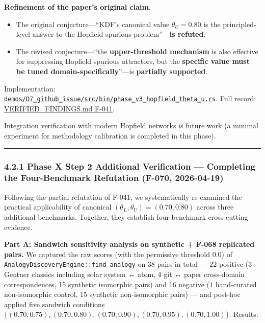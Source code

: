 \textbf{Refinement of the paper's original claim.}

\begin{itemize}
\tightlist
\item
  The original conjecture---``KDF's canonical value \(\theta_U = 0.80\) is the principled-level answer to the Hopfield spurious problem''---\textbf{is refuted}.
\item
  The revised conjecture---``the \textbf{upper-threshold mechanism} is also effective for suppressing Hopfield spurious attractors, but the \textbf{specific value must be tuned domain-specifically}''---is \textbf{partially supported}.
\end{itemize}

Implementation: \href{../../demos/D7_github_issue/src/bin/phase_v3_hopfield_theta_u.rs}{\texttt{demos/D7\_github\_issue/src/bin/phase\_v3\_hopfield\_theta\_u.rs}}. Full record: \href{../VERIFIED_FINDINGS.md}{VERIFIED\_FINDINGS.md F-041}.

Integration verification with modern Hopfield networks \citep{ramsauer2021hopfield} is future work (a minimal experiment for methodology calibration is completed in this phase).

\begin{center}\rule{0.5\linewidth}{0.5pt}\end{center}

\subsubsection{4.2.1 Phase X Step 2 Additional Verification --- Completing the Four-Benchmark Refutation (F-070, 2026-04-19)}\label{phase-x-step-2-additional-verification-completing-the-four-benchmark-refutation-f-070-2026-04-19}

Following the partial refutation of F-041, we systematically re-examined the practical applicability of canonical \((\theta_L, \theta_U) = (0.70, 0.80)\) across three additional benchmarks. Together, they establish four-benchmark cross-cutting evidence.

\textbf{Part A: Sandwich sensitivity analysis on synthetic + F-068 replicated pairs.} We captured the raw scores (with the permissive threshold 0.0) of \texttt{AnalogyDiscoveryEngine::find\_analogy} on 38 pairs in total --- 22 positive (3 Gentner classics including solar system ↔ atom, 4 git ↔ paper cross-domain correspondences, 15 synthetic isomorphic pairs) and 16 negative (1 hand-curated non-isomorphic control, 15 synthetic non-isomorphic pairs) --- and post-hoc applied five sandwich conditions \(\{(0.70, 0.75), (0.70, 0.80), (0.70, 0.90), (0.70, 0.95), (0.70, 1.00)\}\). Results:


